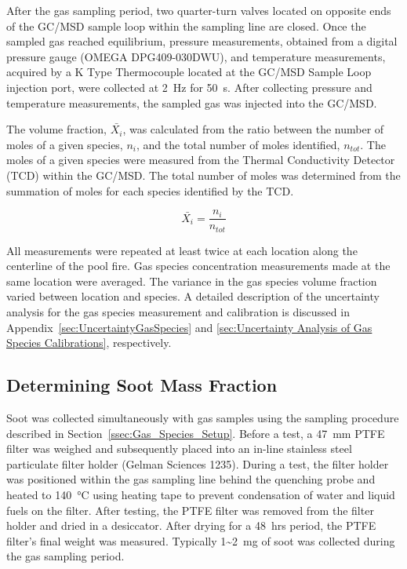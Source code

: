 \documentclass[12pt]{article}
\begin{document}
After the gas sampling period, two quarter-turn valves located on opposite ends of the GC/MSD sample loop within the sampling line are closed. Once the sampled gas reached equilibrium, pressure measurements, obtained from a digital pressure gauge (OMEGA DPG409-030DWU), and temperature measurements, acquired by a K Type Thermocouple located at the GC/MSD Sample Loop injection port, were collected at 2~\si{Hz} for 50~\si{s}. After collecting pressure and temperature measurements, the sampled gas was injected into the GC/MSD.

The volume fraction, $\bar{X_{i}}$, was calculated from the ratio between the number of moles of a given species, $n_{i}$, and the total number of moles identified, $n_{tot}$. The moles of a given species were measured from the Thermal Conductivity Detector (TCD) within the GC/MSD. The total number of moles was determined from the summation of moles for each species identified by the TCD.

\begin{equation}\label{eq:volume_fraction}
  \bar{X_{i}}= \frac{n_{i}}{n_{tot}}
\end{equation}

All measurements were repeated at least twice at each location along the centerline of the pool fire. Gas species concentration measurements made at the same location were averaged. The variance in the gas species volume fraction varied between location and species. A detailed description of the uncertainty analysis for the gas species measurement and calibration is discussed in Appendix~\ref{sec:UncertaintyGasSpecies} and \ref{sec:Uncertainty Analysis of Gas Species Calibrations}, respectively.

\subsection{Determining Soot Mass Fraction}
\label{ssec:Soot_Setup}

Soot was collected simultaneously with gas samples using the sampling procedure described in Section~\ref{ssec:Gas_Species_Setup}. Before a test, a 47~\si{mm} PTFE filter was weighed and subsequently placed into an in-line stainless steel particulate filter holder (Gelman Sciences 1235). During a test, the filter holder was positioned within the gas sampling line behind the quenching probe and heated to 140~°\si{C} using heating tape to prevent condensation of water and liquid fuels on the filter. After testing, the PTFE filter was removed from the filter holder and dried in a desiccator. After drying for a 48~\si{hrs} period, the PTFE filter's final weight was measured. Typically 1\textasciitilde2~\si{mg} of soot was collected during the gas sampling period.
\end{document}
